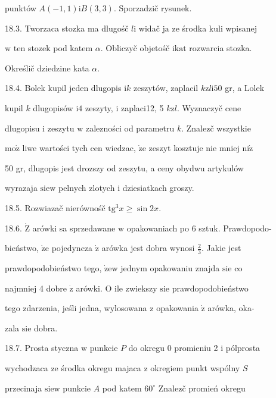 \documentclass[a4paper,12pt]{article}
\begin{document}
punktów $A(-1,1)\mathrm{i}B(3,3)$. Sporzadzič rysunek.

18.3. Tworzaca stozka ma dlugośč $l \mathrm{i}$ widač $\mathrm{j}\mathrm{a}$ ze środka kuli wpisanej

$\mathrm{w}$ ten stozek pod katem $\alpha$. Obliczyč objetośč $\mathrm{i}\mathrm{k}\mathrm{a}\mathrm{t}$ rozwarcia stozka.

Określič dziedzine kata $\alpha.$

18.4. Bolek kupil jeden dlugopis $\mathrm{i}k$ zeszytów, zaplacil $k\mathrm{z}l\mathrm{i}50$ gr, a Lolek

kupil $k$ dlugopisów $\mathrm{i}4$ zeszyty, $\mathrm{i}$ zaplaci12, 5 $k\mathrm{z}l$. Wyznaczyč cene

dlugopisu $\mathrm{i}$ zeszytu $\mathrm{w}$ zalezności od parametru $k$. Znalez$\acute{}$č wszystkie

$\mathrm{m}\mathrm{o}\dot{\mathrm{z}}$ liwe wartości tych cen wiedzac, $\dot{\mathrm{z}}\mathrm{e}$ zeszyt kosztuje nie mniej $\mathrm{n}\mathrm{i}\dot{\mathrm{z}}$

50 gr, dlugopis jest drozszy od zeszytu, a ceny obydwu artykulów

wyrazaja $\mathrm{s}\mathrm{i}\mathrm{e}\mathrm{w}$ pelnych zlotych $\mathrm{i}$ dziesiatkach groszy.

18.5. Rozwiazač nierównośč $\mathrm{t}\mathrm{g}^{3}x\geq\sin 2x.$

18.6. $\dot{\mathrm{Z}}$ arówki sa sprzedawane $\mathrm{w}$ opakowaniach po 6 sztuk. Prawdopodo-

bieństwo, $\dot{\mathrm{z}}\mathrm{e}$ pojedyncza $\dot{\mathrm{z}}$ arówka jest dobra wynosi $\displaystyle \frac{2}{3}$. Jakie jest

prawdopodobieństwo tego, $\dot{\mathrm{z}}\mathrm{e} \mathrm{w}$ jednym opakowaniu znajda $\mathrm{s}\mathrm{i}\mathrm{e}$ co

najmniej 4 dobre $\dot{\mathrm{z}}$ arówki. $\mathrm{O}$ ile zwiekszy $\mathrm{s}\mathrm{i}\mathrm{e}$ prawdopodobieństwo

tego zdarzenia, jeśli jedna, wylosowana $\mathrm{z}$ opakowania $\dot{\mathrm{z}}$ arówka, oka-

zala $\mathrm{s}\mathrm{i}\mathrm{e}$ dobra.

18.7. Prosta styczna $\mathrm{w}$ punkcie $P$ do okregu $0$ promieniu 2 $\mathrm{i}$ pólprosta

wychodzaca ze środka okregu majaca $\mathrm{z}$ okregiem punkt wspólny $S$

przecinaja $\mathrm{s}\mathrm{i}\mathrm{e}\mathrm{w}$ punkcie $A$ pod katem $60^{\circ}$ Znalez$\acute{}$č promień okregu
\end{document}
